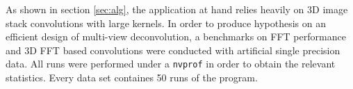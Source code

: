 As shown in section \ref{sec:alg}, the application at hand relies heavily on 3D image stack convolutions with large kernels. In order to produce hypothesis on an efficient design of multi-view deconvolution, a benchmarks on FFT performance and 3D FFT based convolutions were conducted with artificial single precision data. All runs were performed under a \texttt{nvprof} in order to obtain the relevant statistics. Every data set containes 50 runs of the program. 
